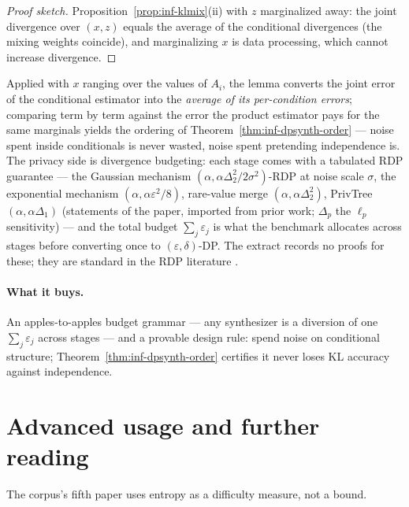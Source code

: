 \begin{proof}[Proof sketch]
Proposition~\ref{prop:inf-klmix}(ii) with $z$ marginalized away: the joint divergence
over $(x, z)$ equals the average of the conditional divergences (the mixing weights
coincide), and marginalizing $x$ is data processing, which cannot increase
divergence.
\end{proof}

Applied with $x$ ranging over the values of $A_i$, the lemma converts the joint error
of the conditional estimator into the \emph{average of its per-condition errors};
comparing term by term against the error the product estimator pays for the same
marginals yields the ordering of Theorem~\ref{thm:inf-dpsynth-order} --- noise spent
inside conditionals is never wasted, noise spent pretending independence is. The
privacy side is divergence budgeting: each stage comes with a tabulated RDP guarantee
--- the Gaussian mechanism $(\alpha, \alpha \Delta_2^2/2\sigma^2)$-RDP at noise scale
$\sigma$, the exponential mechanism $(\alpha, \alpha\varepsilon^2/8)$, rare-value
merge $(\alpha, \alpha\Delta_2^2)$, PrivTree $(\alpha, \alpha\Delta_1)$ (statements of
the paper, imported from prior work; $\Delta_p$ the $\ell_p$ sensitivity) --- and the
total budget $\sum_j \varepsilon_j$ is what the benchmark allocates across stages
before converting once to $(\varepsilon, \delta)$-DP. The extract records no proofs
for these; they are standard in the RDP literature \citep{information-theory-bg5}.

\paragraph{What it buys.}
An apples-to-apples budget grammar --- any synthesizer is a diversion of one
$\sum_j \varepsilon_j$ across stages --- and a provable design rule: spend noise on
conditional structure; Theorem~\ref{thm:inf-dpsynth-order} certifies it never loses
KL accuracy against independence.

\section{Advanced usage and further reading}
\label{sec:inf-advanced}

The corpus's fifth paper uses entropy as a difficulty measure, not a bound.


